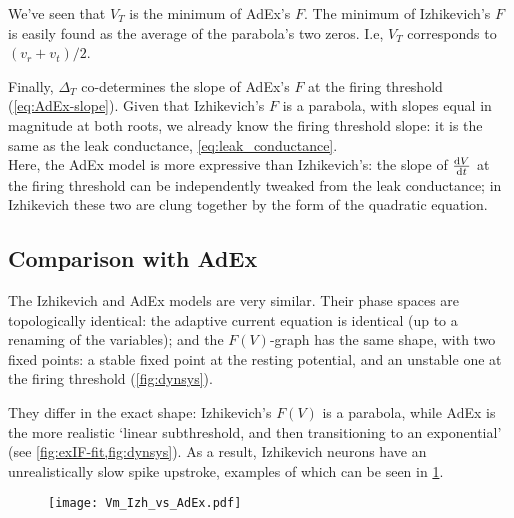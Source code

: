 We've seen that $V_T$ is the minimum of AdEx's $F$.
The minimum of Izhikevich's $F$ is easily found as the average of the parabola's two zeros. I.e, $V_T$ corresponds to $(v_r + v_t) / 2$.

Finally, $Δ_T$ co-determines the slope of AdEx's $F$ at the firing threshold (\cref{eq:AdEx-slope}). Given that Izhikevich's $F$ is a parabola, with slopes equal in magnitude at both roots, we already know the firing threshold slope: it is the same as the leak conductance, \cref{eq:leak_conductance}.\\
Here, the AdEx model is more expressive than Izhikevich's: the slope of $\frac{\mathrm{d}V}{\mathrm{d}t}$ at the firing threshold can be independently tweaked from the leak conductance; in Izhikevich these two are clung together by the form of the quadratic equation.

\FloatBarrier
\subsection{Comparison with AdEx}

The Izhikevich and AdEx models are very similar. Their phase spaces are topologically identical:
the adaptive current equation is identical (up to a renaming of the variables); and the $F(V)$-graph has the same shape, with two fixed points: a stable fixed point at the resting potential, and an unstable one at the firing threshold (\cref{fig:dynsys}).

They differ in the exact shape: Izhikevich's $F(V)$ is a parabola, while AdEx is the more realistic `linear subthreshold, and then transitioning to an exponential' (see \cref{fig:exIF-fit,fig:dynsys}).
As a result, Izhikevich neurons have an unrealistically slow spike upstroke, examples of which can be seen in \cref{fig:Vm_Izh_vs_AdEx}.

\begin{figure}
    \hspace*{-3em}
    \texttt{[image: Vm\_Izh\_vs\_AdEx.pdf]}
    \label{fig:Vm_Izh_vs_AdEx}
\end{figure}

